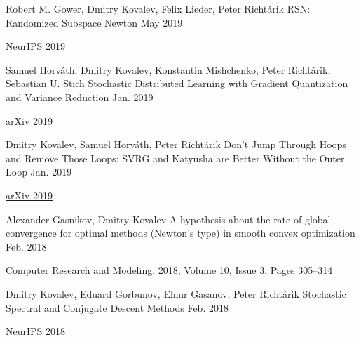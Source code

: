 \begin{cventries}
\cventry
{Robert M. Gower, Dmitry Kovalev, Felix Lieder, Peter Richtárik} %
{RSN: Randomized Subspace Newton} %
{} %
{May 2019} %
{ %
	\begin{cvitems}
		\item {\href{https://papers.nips.cc/paper/8351-rsn-randomized-subspace-newton}{NeurIPS 2019}}
	\end{cvitems}
}

\cventry
{Samuel Horváth, Dmitry Kovalev, Konstantin Mishchenko, Peter Richtárik, Sebastian U. Stich} %
{Stochastic Distributed Learning with Gradient Quantization and Variance Reduction} %
{} %
{Jan. 2019} %
{ %
	\begin{cvitems}
		\item {\href{https://arxiv.org/abs/1904.05115}{arXiv 2019}}
	\end{cvitems}
}

\cventry
{Dmitry Kovalev, Samuel Horváth, Peter Richtárik} %
{Don't Jump Through Hoops and Remove Those Loops: SVRG and Katyusha are Better Without the Outer Loop} %
{} %
{Jan. 2019} %
{ %
	\begin{cvitems}
		\item {\href{https://arxiv.org/abs/1901.08689}{arXiv 2019}}
	\end{cvitems}
}


\cventry
{Alexander Gasnikov, Dmitry Kovalev	} %
{A hypothesis about the rate of global convergence for optimal methods (Newton's type) in smooth convex optimization } %
{} %
{Feb. 2018} %
{ %
	\begin{cvitems}
		\item {\href{http://www.mathnet.ru/php/archive.phtml?wshow=paper\&jrnid=crm\&paperid=253\&option\_lang=eng}{
				Computer Research and Modeling, 2018,	Volume 10,	Issue 3,	Pages 305–314}}
	\end{cvitems}
}


\cventry
{Dmitry Kovalev, Eduard Gorbunov, Elnur Gasanov, Peter Richtárik} %
{Stochastic Spectral and Conjugate Descent Methods} %
{} %
{Feb. 2018} %
{ %
\begin{cvitems}
\item {\href{https://papers.nips.cc/paper/7596-stochastic-spectral-and-conjugate-descent-methods}{NeurIPS 2018}}
\end{cvitems}
}



\end{cventries}